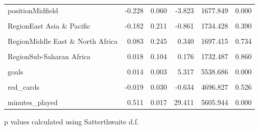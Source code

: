 \documentclass[
  12pt]{article}
\begin{document}
\begin{table}[!h]
\begin{threeparttable}
\begin{tabular}{lrrrrr}
positionMidfield & -0.228 & 0.060 & -3.823 & 1677.849 & 0.000\\
\cellcolor{gray!10}{citizen\_of\_club\_countryYes} & \cellcolor{gray!10}{-0.399} & \cellcolor{gray!10}{0.038} & \cellcolor{gray!10}{-10.630} & \cellcolor{gray!10}{5729.204} & \cellcolor{gray!10}{0.000}\\
RegionEast Asia \& Pacific & -0.182 & 0.211 & -0.861 & 1734.428 & 0.390\\
\addlinespace
\cellcolor{gray!10}{RegionLatin America \& Caribbean} & \cellcolor{gray!10}{0.248} & \cellcolor{gray!10}{0.063} & \cellcolor{gray!10}{3.913} & \cellcolor{gray!10}{1796.512} & \cellcolor{gray!10}{0.000}\\
RegionMiddle East \& North Africa & 0.083 & 0.245 & 0.340 & 1697.415 & 0.734\\
\cellcolor{gray!10}{RegionNorth America} & \cellcolor{gray!10}{-0.005} & \cellcolor{gray!10}{0.225} & \cellcolor{gray!10}{-0.023} & \cellcolor{gray!10}{1778.504} & \cellcolor{gray!10}{0.981}\\
RegionSub-Saharan Africa & 0.018 & 0.104 & 0.176 & 1732.487 & 0.860\\
\cellcolor{gray!10}{age\_c} & \cellcolor{gray!10}{-0.001} & \cellcolor{gray!10}{0.004} & \cellcolor{gray!10}{-0.252} & \cellcolor{gray!10}{2354.791} & \cellcolor{gray!10}{0.801}\\
\addlinespace
goals & 0.014 & 0.003 & 5.317 & 5538.686 & 0.000\\
\cellcolor{gray!10}{assists} & \cellcolor{gray!10}{0.013} & \cellcolor{gray!10}{0.004} & \cellcolor{gray!10}{3.445} & \cellcolor{gray!10}{5075.156} & \cellcolor{gray!10}{0.001}\\
red\_cards & -0.019 & 0.030 & -0.634 & 4696.827 & 0.526\\
\cellcolor{gray!10}{yellow\_cards} & \cellcolor{gray!10}{0.006} & \cellcolor{gray!10}{0.004} & \cellcolor{gray!10}{1.420} & \cellcolor{gray!10}{5406.162} & \cellcolor{gray!10}{0.156}\\
minutes\_played & 0.511 & 0.017 & 29.411 & 5605.944 & 0.000\\
\bottomrule
\end{tabular}
\begin{tablenotes}
\item  p values calculated using Satterthwaite d.f. 
\end{tablenotes}
\end{threeparttable}
\end{table} \begin{table}[!h]
\centering

\end{table}
\end{document}
